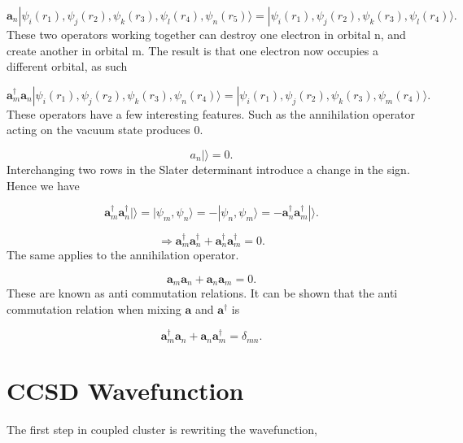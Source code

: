 \begin{equation}
\textbf{a}_n |\psi_i(r_1), \psi_j(r_2), \psi_k(r_3), \psi_l(r_4), \psi_n(r_5) \rangle = |\psi_i(r_1), \psi_j(r_2), \psi_k(r_3), \psi_l(r_4) \rangle  .
\end{equation}
These two operators working together can destroy one electron in orbital n, and create another in orbital m. The result is that one electron now occupies a different orbital, as such

\begin{equation}
\textbf{a}^{\dag}_m \textbf{a}_n |\psi_i(r_1), \psi_j(r_2), \psi_k(r_3), \psi_n(r_4) \rangle = |\psi_i(r_1), \psi_j(r_2), \psi_k(r_3), \psi_m(r_4) \rangle .
\end{equation}
These operators have a few interesting features. Such as the annihilation operator acting on the vacuum state produces 0.

\begin{equation}
a_n | \rangle = 0  .
\end{equation}
Interchanging two rows in the Slater determinant introduce a change in the sign. Hence we have

\begin{equation}
\textbf{a}^{\dag}_m \textbf{a}^{\dag}_n | \rangle = |\psi_m, \psi_n \rangle = - |\psi_n, \psi_m \rangle = -\textbf{a}^{\dag}_n \textbf{a}^{\dag}_m | \rangle  .
\end{equation}

\begin{equation}
\Rightarrow \textbf{a}^{\dag}_m \textbf{a}^{\dag}_n + \textbf{a}^{\dag}_n \textbf{a}^{\dag}_m = 0 .
\end{equation}
The same applies to the annihilation operator.

\begin{equation}
\textbf{a}_m \textbf{a}_n + \textbf{a}_n \textbf{a}_m = 0 .
\end{equation}
These are known as anti commutation relations. It can be shown that the anti commutation relation when mixing $\textbf{a}$ and $\textbf{a}^{\dag}$ is

\begin{equation}
\textbf{a}^{\dag}_m \textbf{a}_n + \textbf{a}_n \textbf{a}^{\dag}_m = \delta_{mn} . \label{ccsd_anni_creato_operator_combo}
\end{equation}

\section{CCSD Wavefunction}
The first step in coupled cluster is rewriting the wavefunction,

